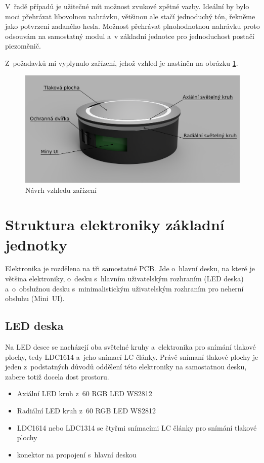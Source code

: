 V~řadě případů je užitečné mít možnost zvukové zpětné vazby.
Ideální by bylo moci přehrávat libovolnou nahrávku, většinou ale stačí jednoduchý tón, řekněme jako potvrzení zadaného hesla.
Možnost přehrávat plnohodnotnou nahrávku proto odsouvám na samostatný modul a~v základní jednotce pro jednoduchost postačí piezoměnič.

Z~požadavků mi vyplynulo zařízení, jehož vzhled je nastíněn na obrázku \ref{fig:AHS-nacrt}.
\begin{figure}
    \centering
    \includegraphics[width=\textwidth]{text/PraktickaCast/img/AHS-nacrt.png}
    \caption{Návrh vzhledu zařízení}
    \label{fig:AHS-nacrt}
\end{figure}

\newpage
\section{Struktura elektroniky základní jednotky}

Elektronika je rozdělena na tři samostatné PCB.
Jde o~hlavní desku, na které je většina elektroniky, o~desku s~hlavním uživatelským rozhraním (LED deska) a~o~obslužnou desku s~minimalistickým uživatelským rozhraním pro neherní obsluhu (Mini~UI).

\subsection{LED deska}
Na LED desce se nacházejí oba světelné kruhy a~elektronika pro snímání tlakové plochy, tedy LDC1614 \cite{LDC1614} a~jeho snímací LC články.
Právě snímaní tlakové plochy je jeden z~podstatných důvodů oddělení této elektroniky na samostatnou desku, zabere totiž docela dost prostoru.

\begin{itemize}
    \item Axiální LED kruh z~60 RGB LED WS2812
    \item Radiální LED kruh z~60 RGB LED WS2812
    \item LDC1614 nebo LDC1314 se čtyřmi snímacími LC články pro snímání tlakové plochy
    \item konektor na propojení s~hlavní deskou
\end{itemize}

